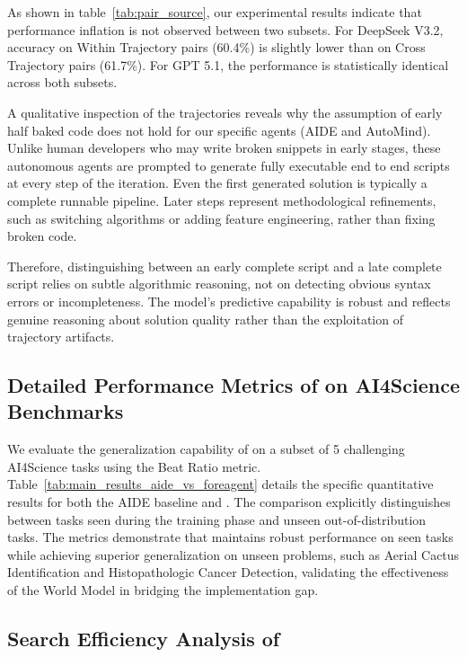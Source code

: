 As shown in table~\ref{tab:pair_source}, our experimental results indicate that performance inflation is not observed between two subsets. For DeepSeek V3.2, accuracy on Within Trajectory pairs (60.4\%) is slightly lower than on Cross Trajectory pairs (61.7\%). For GPT 5.1, the performance is statistically identical across both subsets.

A qualitative inspection of the trajectories reveals why the assumption of early half baked code does not hold for our specific agents (AIDE and AutoMind).
Unlike human developers who may write broken snippets in early stages, these autonomous agents are prompted to generate fully executable end to end scripts at every step of the iteration.
Even the first generated solution is typically a complete runnable pipeline.
Later steps represent methodological refinements, such as switching algorithms or adding feature engineering, rather than fixing broken code.

Therefore, distinguishing between an early complete script and a late complete script relies on subtle algorithmic reasoning, not on detecting obvious syntax errors or incompleteness.
The model's predictive capability is robust and reflects genuine reasoning about solution quality rather than the exploitation of trajectory artifacts.


\subsection{Detailed Performance Metrics of \ours on AI4Science Benchmarks}
\label{app:ai4s_bench}

We evaluate the generalization capability of \ours on a subset of 5 challenging AI4Science tasks using the Beat Ratio metric.
Table~\ref{tab:main_results_aide_vs_foreagent} details the specific quantitative results for both the AIDE baseline and \ours.
The comparison explicitly distinguishes between tasks seen during the training phase and unseen out-of-distribution tasks.
The metrics demonstrate that \ours maintains robust performance on seen tasks while achieving superior generalization on unseen problems, such as Aerial Cactus Identification and Histopathologic Cancer Detection, validating the effectiveness of the World Model in bridging the implementation gap.


\subsection{Search Efficiency Analysis of \ours}
\label{app:search_efficiency}

